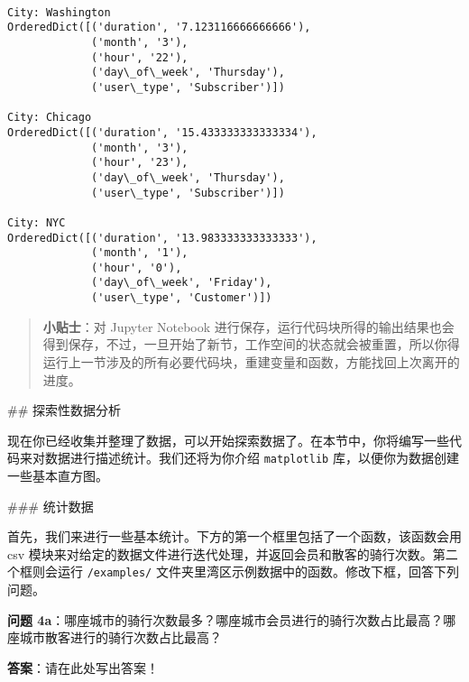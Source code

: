 \documentclass[11pt]{article}
\begin{document}
    \begin{Verbatim}[commandchars=\\\{\}]

City: Washington
OrderedDict([('duration', '7.123116666666666'),
             ('month', '3'),
             ('hour', '22'),
             ('day\_of\_week', 'Thursday'),
             ('user\_type', 'Subscriber')])

City: Chicago
OrderedDict([('duration', '15.433333333333334'),
             ('month', '3'),
             ('hour', '23'),
             ('day\_of\_week', 'Thursday'),
             ('user\_type', 'Subscriber')])

City: NYC
OrderedDict([('duration', '13.983333333333333'),
             ('month', '1'),
             ('hour', '0'),
             ('day\_of\_week', 'Friday'),
             ('user\_type', 'Customer')])

    \end{Verbatim}

    \begin{quote}
\textbf{小贴士}：对 Jupyter Notebook
进行保存，运行代码块所得的输出结果也会得到保存，不过，一旦开始了新节，工作空间的状态就会被重置，所以你得运行上一节涉及的所有必要代码块，重建变量和函数，方能找回上次离开的进度。
\end{quote}

 \#\# 探索性数据分析

现在你已经收集并整理了数据，可以开始探索数据了。在本节中，你将编写一些代码来对数据进行描述统计。我们还将为你介绍
\texttt{matplotlib} 库，以便你为数据创建一些基本直方图。

 \#\#\# 统计数据

首先，我们来进行一些基本统计。下方的第一个框里包括了一个函数，该函数会用
csv
模块来对给定的数据文件进行迭代处理，并返回会员和散客的骑行次数。第二个框则会运行
\texttt{/examples/}
文件夹里湾区示例数据中的函数。修改下框，回答下列问题。

\textbf{问题
4a}：哪座城市的骑行次数最多？哪座城市会员进行的骑行次数占比最高？哪座城市散客进行的骑行次数占比最高？

\textbf{答案}：请在此处写出答案！
\end{document}
